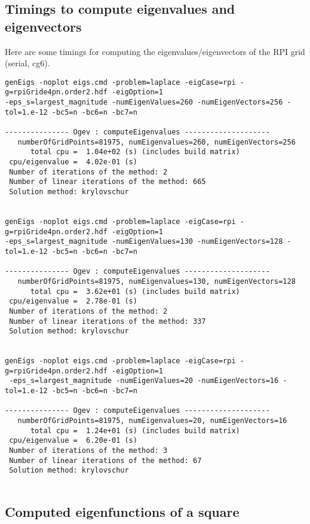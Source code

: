 \clearpage
\subsection{Timings to compute eigenvalues and eigenvectors}

Here are some timings for computing the eigenvalues/eigenvectors of the RPI grid (serial, cg6). 
\begin{Verbatim}[fontsize=\footnotesize]
genEigs -noplot eigs.cmd -problem=laplace -eigCase=rpi -g=rpiGride4pn.order2.hdf -eigOption=1 
-eps_s=largest_magnitude -numEigenValues=260 -numEigenVectors=256 -tol=1.e-12 -bc5=n -bc6=n -bc7=n 

--------------- Ogev : computeEigenvalues --------------------
   numberOfGridPoints=81975, numEigenvalues=260, numEigenVectors=256
      total cpu =  1.04e+02 (s) (includes build matrix)
 cpu/eigenvalue =  4.02e-01 (s)
 Number of iterations of the method: 2
 Number of linear iterations of the method: 665
 Solution method: krylovschur


genEigs -noplot eigs.cmd -problem=laplace -eigCase=rpi -g=rpiGride4pn.order2.hdf -eigOption=1 
-eps_s=largest_magnitude -numEigenValues=130 -numEigenVectors=128 -tol=1.e-12 -bc5=n -bc6=n -bc7=n 

--------------- Ogev : computeEigenvalues --------------------
   numberOfGridPoints=81975, numEigenvalues=130, numEigenVectors=128
      total cpu =  3.62e+01 (s) (includes build matrix)
 cpu/eigenvalue =  2.78e-01 (s)
 Number of iterations of the method: 2
 Number of linear iterations of the method: 337
 Solution method: krylovschur


genEigs -noplot eigs.cmd -problem=laplace -eigCase=rpi -g=rpiGride4pn.order2.hdf -eigOption=1
 -eps_s=largest_magnitude -numEigenValues=20 -numEigenVectors=16 -tol=1.e-12 -bc5=n -bc6=n -bc7=n 

--------------- Ogev : computeEigenvalues --------------------
   numberOfGridPoints=81975, numEigenvalues=20, numEigenVectors=16
      total cpu =  1.24e+01 (s) (includes build matrix)
 cpu/eigenvalue =  6.20e-01 (s)
 Number of iterations of the method: 3
 Number of linear iterations of the method: 67
 Solution method: krylovschur


\end{Verbatim}


\subsection{Computed eigenfunctions of a square}

